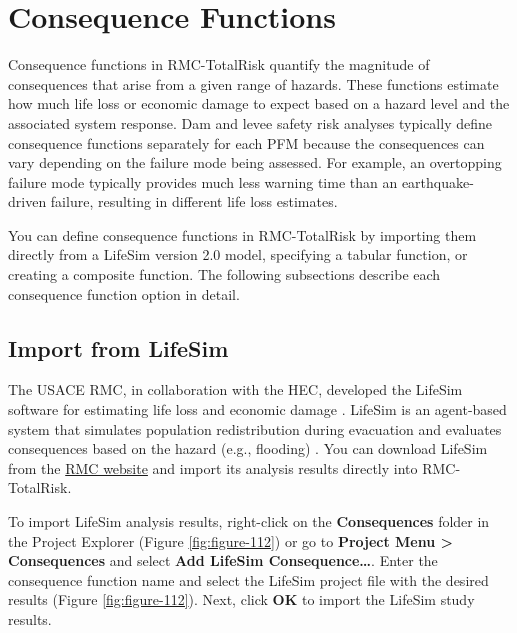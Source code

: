 \documentclass[
]{book}
\begin{document}
\hypertarget{consequence-functions}{%
\chapter{Consequence Functions}\label{consequence-functions}}

Consequence functions in RMC-TotalRisk quantify the magnitude of consequences that arise from a given range of hazards. These functions estimate how much life loss or economic damage to expect based on a hazard level and the associated system response. Dam and levee safety risk analyses typically define consequence functions separately for each PFM because the consequences can vary depending on the failure mode being assessed. For example, an overtopping failure mode typically provides much less warning time than an earthquake-driven failure, resulting in different life loss estimates.

You can define consequence functions in RMC-TotalRisk by importing them directly from a LifeSim version 2.0 model, specifying a tabular function, or creating a composite function. The following subsections describe each consequence function option in detail.

\hypertarget{import-from-lifesim}{%
\section{Import from LifeSim}\label{import-from-lifesim}}

The USACE RMC, in collaboration with the HEC, developed the LifeSim software for estimating life loss and economic damage \citep{cite-LifeSimManual}. LifeSim is an agent-based system that simulates population redistribution during evacuation and evaluates consequences based on the hazard (e.g., flooding) \citep{cite-Fields2016}. You can download LifeSim from the \href{https://www.rmc.usace.army.mil/Software/LifeSim/}{RMC website} and import its analysis results directly into RMC-TotalRisk.

To import LifeSim analysis results, right-click on the \textbf{Consequences} folder in the Project Explorer (Figure \ref{fig:figure-112}) or go to \textbf{Project Menu \textgreater{} Consequences} and select \textbf{Add LifeSim Consequence\ldots{}}. Enter the consequence function name and select the LifeSim project file with the desired results (Figure \ref{fig:figure-112}). Next, click \textbf{OK} to import the LifeSim study results.
\end{document}
